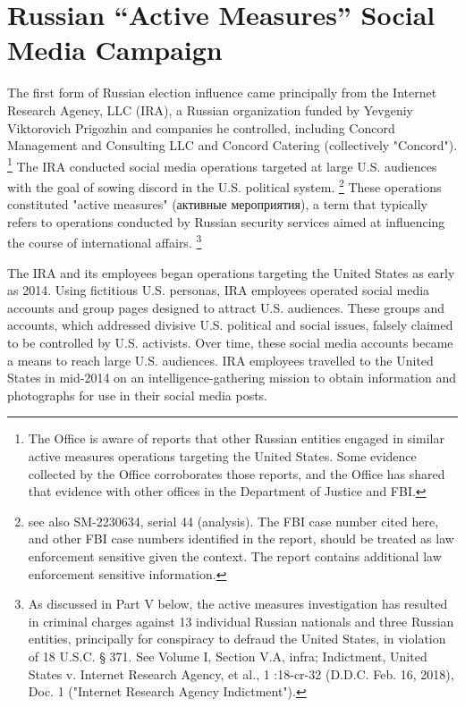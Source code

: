 \section{Russian ``Active Measures'' Social Media Campaign}

The first form of Russian election influence came principally from the Internet Research Agency, LLC (IRA), a Russian organization funded by Yevgeniy Viktorovich Prigozhin and companies he controlled, including Concord Management and Consulting LLC and Concord Catering (collectively "Concord").%
\footnote{The Office is aware of reports that other Russian entities engaged in similar active measures operations targeting the United States.
Some evidence collected by the Office corroborates those reports, and the Office has shared that evidence with other offices in the Department of Justice and FBI.}
The IRA conducted social media operations targeted at large U.S. audiences with the goal of sowing discord in the U.S. political system.%
\footnote{
see also SM-2230634, serial 44 (analysis).
The FBI case number cited here, and other FBI case numbers identified in the report, should be treated as law enforcement sensitive given the context.
The report contains additional law enforcement sensitive information.}
These operations constituted "active measures" (активные мероприятия), a term that typically refers to operations conducted by Russian security services aimed at influencing the course of international affairs.%
\footnote{As discussed in Part V below, the active measures investigation has resulted in criminal charges against 13 individual Russian nationals and three Russian entities, principally for conspiracy to defraud the United States, in violation of 18 U.S.C. § 371.
See Volume I, Section V.A, infra; Indictment, United States v. Internet Research Agency, et al., 1 :18-cr-32 (D.D.C. Feb. 16, 2018), Doc. 1 ("Internet Research Agency Indictment").}

The IRA and its employees began operations targeting the United States as early as 2014.
Using fictitious U.S. personas, IRA employees operated social media accounts and group pages designed to attract U.S. audiences.
These groups and accounts, which addressed divisive U.S. political and social issues, falsely claimed to be controlled by U.S. activists.
Over time, these social media accounts became a means to reach large U.S. audiences.
IRA employees travelled to the United States in mid-2014 on an intelligence-gathering mission to obtain information and photographs for use in their social media posts.

